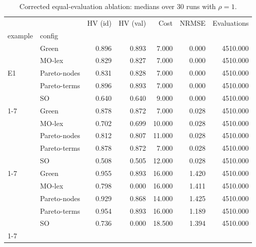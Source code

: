 \begin{table}[t]\centering
\caption{Corrected equal-evaluation ablation: medians over 30 runs with $\rho=1$.}
\begin{tabular}{llrrrrr}
\toprule
 &  & HV (id) & HV (val) & Cost & NRMSE & Evaluations \\
example & config &  &  &  &  &  \\
\midrule
\multirow[t]{5}{*}{E1} & Green & 0.896 & 0.893 & 7.000 & 0.000 & 4510.000 \\
 & MO-lex & 0.829 & 0.827 & 7.000 & 0.000 & 4510.000 \\
 & Pareto-nodes & 0.831 & 0.828 & 7.000 & 0.000 & 4510.000 \\
 & Pareto-terms & 0.896 & 0.893 & 7.000 & 0.000 & 4510.000 \\
 & SO & 0.640 & 0.640 & 9.000 & 0.000 & 4510.000 \\
\cline{1-7}
\multirow[t]{5}{*}{E2} & Green & 0.878 & 0.872 & 7.000 & 0.028 & 4510.000 \\
 & MO-lex & 0.702 & 0.699 & 10.000 & 0.028 & 4510.000 \\
 & Pareto-nodes & 0.812 & 0.807 & 11.000 & 0.028 & 4510.000 \\
 & Pareto-terms & 0.878 & 0.872 & 7.000 & 0.028 & 4510.000 \\
 & SO & 0.508 & 0.505 & 12.000 & 0.028 & 4510.000 \\
\cline{1-7}
\multirow[t]{5}{*}{E3} & Green & 0.955 & 0.893 & 16.000 & 1.420 & 4510.000 \\
 & MO-lex & 0.798 & 0.000 & 16.000 & 1.411 & 4510.000 \\
 & Pareto-nodes & 0.929 & 0.868 & 14.000 & 1.425 & 4510.000 \\
 & Pareto-terms & 0.954 & 0.893 & 16.000 & 1.189 & 4510.000 \\
 & SO & 0.736 & 0.000 & 18.500 & 1.394 & 4510.000 \\
\cline{1-7}
\bottomrule
\end{tabular}
\end{table}

